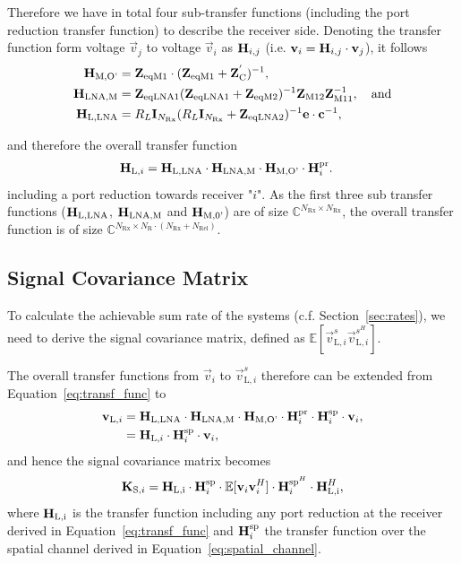 Therefore we have in total four sub-transfer functions (including the port reduction transfer function) to describe the receiver side.
Denoting the transfer function form voltage $\vec{v}_j$ to voltage $\vec{v}_i$ as $\mathbf{H}_{i,j}$ (i.e. $\mathbf{v}_i = \mathbf{H}_{i,j} \cdot\mathbf{v}_j$), it follows
\begin{align}
\mathbf{H}_\text{M,O'} &= \mathbf{Z}_\text{eqM1}\cdot(\mathbf{Z}_\text{eqM1} + \mathbf{Z}_\text{C}^{'})^{-1}, \\
\mathbf{H}_\text{LNA,M} &= \mathbf{Z}_\text{eqLNA1}(\mathbf{Z}_\text{eqLNA1}+\mathbf{Z}_\text{eqM2})^{-1}\mathbf{Z}_\text{M12} \mathbf{Z}_\text{M11}^{-1},\quad\text{and}\\
\mathbf{H}_\text{L,LNA} &= R_L\mathbf{I}_{N_\text{Rx}}(R_L\mathbf{I}_{N_\text{Rx}}+\mathbf{Z}_\text{eqLNA2})^{-1}\mathbf{e}\cdot\mathbf{c}^{-1},
\end{align}

and therefore the overall transfer function
\begin{align}
\label{eq:transf_func}
\mathbf{H}_{\text{L},i} &= 
	\mathbf{H}_\text{L,LNA}\cdot\mathbf{H}_\text{LNA,M}\cdot\mathbf{H}_\text{M,O'}\cdot\mathbf{H}_i^\text{pr}.
\end{align}
including a port reduction towards receiver "$i$".
As the first three sub transfer functions ($\mathbf{H}_\text{L,LNA}$, $\mathbf{H}_\text{LNA,M}$ and $\mathbf{H}_\text{M,0'}$) are of size
$\mathbb{C}^{N_\text{Rx}\times N_\text{Rx}}$, the overall transfer function is of size
$\mathbb{C}^{N_\text{Rx}\times N_\text{R}\cdot\left(N_\text{Rx}+N_\text{Rel}\right)}$.
	


\subsection{Signal Covariance Matrix}
\label{sec:sig_cov}
To calculate the achievable sum rate of the systems (c.f. Section~\ref{sec:rates}), we need to derive the signal covariance matrix, defined as $\mathbb{E}[\vec{v}_{\text{L},i}^s\vec{v}_{\text{L},i}^{s^H}]$.

The overall transfer functions from $\vec{v}_i$ to $\vec{v}_{\text{L},i}^s$ therefore can be extended from Equation~\eqref{eq:transf_func} to
\begin{align}
\label{eq:transfer_function}
 \mathbf{v}_{\text{L},i}&= \mathbf{H}_\text{L,LNA}\cdot\mathbf{H}_\text{LNA,M}\cdot\mathbf{H}_\text{M,O'}
		\cdot \mathbf{H}_i^{\text{pr}}\cdot\mathbf{H}_{i}^{\text{sp}} \cdot\mathbf{v}_i,\\\nonumber
 &=\mathbf{H}_{\text{L,}i}\cdot \mathbf{H}_{i}^{\text{sp}}\cdot\mathbf{v}_i,
\end{align}
and hence the signal covariance matrix becomes
\begin{equation}
\label{eq:sig_cov}
\mat{K}_{\text{S},i}=%
	\mat{H}_\text{L,i}\cdot \mat{H}_{i}^{\text{sp}}
	\cdot\mathbb{E}[\vec{v}_i\vec{v}_i^H]\cdot
	\mat{H}_{i}^{\text{sp}^H} \cdot \mat{H}_\text{L,i}^H,
\end{equation}
where $\mathbf{H}_\text{L,i}$ is the transfer function including any port reduction at the receiver derived in Equation~\eqref{eq:transf_func} and $\mathbf{H}_{i}^{\text{sp}}$ the transfer function over the spatial channel derived in Equation~\eqref{eq:spatial_channel}.

